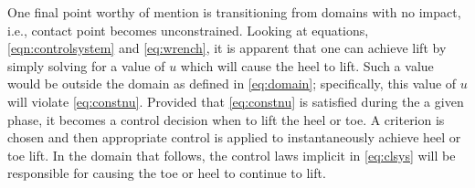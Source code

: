 \begin{remark}
  One final point worthy of mention is transitioning from domains with no impact, i.e., contact point becomes unconstrained. Looking at equations, \eqref{eqn:controlsystem} and \eqref{eq:wrench}, it is apparent that one can achieve lift by simply solving for a value of $u$ which will cause the heel to lift. Such a value would be outside the domain as defined in \eqref{eq:domain}; specifically, this value of $u$ will violate \eqref{eq:constnu}. Provided that \eqref{eq:constnu} is satisfied during the a given phase, it becomes a control decision when to lift the heel or toe. A criterion is chosen and then appropriate control is applied to instantaneously achieve heel or toe lift. In the domain that follows, the control laws implicit in \eqref{eq:clsys} will be responsible for causing the toe or heel to continue to lift.
\end{remark}

